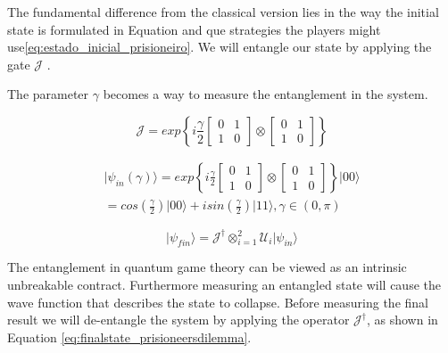 The fundamental difference from the classical version lies in the way the initial state is formulated in Equation and que strategies the players might use\ref{eq:estado_inicial_prisioneiro}. We will entangle our state by applying the gate $\mathcal{J}$ \cite{Letters2002}\cite{Eisert2008}. 

The parameter $\gamma$ becomes a way to measure the entanglement in the system\cite{Eisert2008}.

\begin{equation}
\label{eq:matrix_exponencial_esoterica}
\mathcal{J}=exp\left\{ i\frac{\gamma}{2}\left[\begin{array}{cc}
0 & 1\\
1 & 0
\end{array}\right]\otimes\left[\begin{array}{cc}
0 & 1\\
1 & 0
\end{array}\right]\right\}
\end{equation} 

\begin{equation}
\label{eq:estado_inicial_prisioneiro}
\begin{split}
\vert\psi_{in}(\gamma)\rangle=exp\left\{ i\frac{\gamma}{2}\left[\begin{array}{cc}
0 & 1\\
1 & 0
\end{array}\right]\otimes\left[\begin{array}{cc}
0 & 1\\
1 & 0
\end{array}\right]\right\} \vert00\rangle \\
=cos(\frac{\gamma}{2})\vert00\rangle+isin(\frac{\gamma}{2})\vert11\rangle,\gamma\in(0,\pi)
\end{split}
\end{equation}

\begin{equation}
\vert\psi_{fin}\rangle= \mathcal{J}^{\dagger} \otimes_{i=1}^{2}\mathcal{U}_{i}\vert\psi_{in}\rangle
\label{eq:finalstate_prisioneersdilemma}
\end{equation}

The entanglement in quantum game theory can be viewed as an intrinsic unbreakable contract. Furthermore measuring an entangled state will cause the wave function that describes the state to collapse. Before measuring the final result we will de-entangle the system by applying the operator $\mathcal{J}^{\dagger}$, as shown in Equation \ref{eq:finalstate_prisioneersdilemma}.

